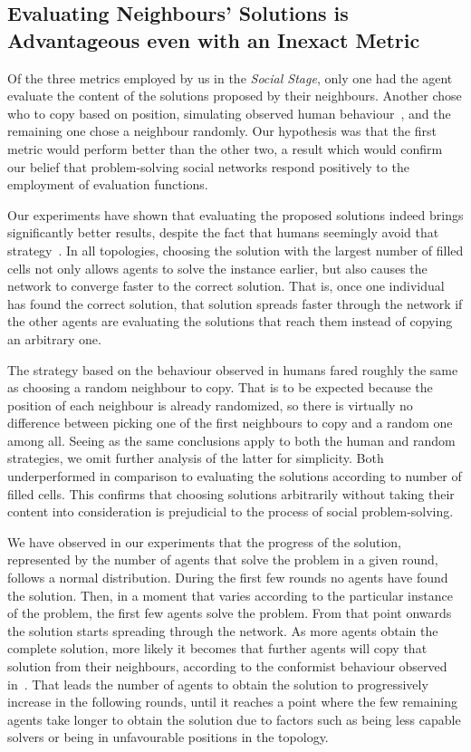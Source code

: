\documentclass{article}
\begin{document}
\subsection{Evaluating Neighbours' Solutions is Advantageous even with an Inexact Metric}

Of the three metrics employed by us in the \emph{Social Stage}, only one had the agent evaluate the content of the solutions proposed by their neighbours. Another chose who to copy based on position, simulating observed human behaviour~\cite{farenzena:collabem}, and the remaining one chose a neighbour randomly. Our hypothesis was that the first metric would perform better than the other two, a result which would confirm our belief that problem-solving social networks respond positively to the employment of evaluation functions.

Our experiments have shown that evaluating the proposed solutions indeed brings significantly better results, despite the fact that humans seemingly avoid that strategy~\cite{farenzena:collabem}. In all topologies, choosing the solution with the largest number of filled cells not only allows agents to solve the instance earlier, but also causes the network to converge faster to the correct solution. That is, once one individual has found the correct solution, that solution spreads faster through the network if the other agents are evaluating the solutions that reach them instead of copying an arbitrary one.

The strategy based on the behaviour observed in humans fared roughly the same as choosing a random neighbour to copy. That is to be expected because the position of each neighbour is already randomized, so there is virtually no difference between picking one of the first neighbours to copy and a random one among all. Seeing as the same conclusions apply to both the human and random strategies, we omit further analysis of the latter for simplicity. Both underperformed in comparison to evaluating the solutions according to number of filled cells. This confirms that choosing solutions arbitrarily without taking their content into consideration is prejudicial to the process of social problem-solving. 

We have observed in our experiments that the progress of the solution, represented by the number of agents that solve the problem in a given round, follows a normal distribution. During the first few rounds no agents have found the solution. Then, in a moment that varies according to the particular instance of the problem, the first few agents solve the problem. From that point onwards the solution starts spreading through the network. As more agents obtain the complete solution, more likely it becomes that further agents will copy that solution from their neighbours, according to the conformist behaviour observed in~\cite{farenzena:collabem}. That leads the number of agents to obtain the solution to progressively increase in the following rounds, until it reaches a point where the few remaining agents take longer to obtain the solution due to factors such as being less capable solvers or being in unfavourable positions in the topology.
\end{document}
